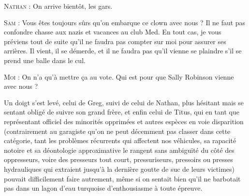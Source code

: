 \begin{dialogue}
\textsc{Nathan} : On arrive bientôt, les gars.

\textsc{Sam} : Vous êtes toujours sûrs qu’on embarque ce clown avec nous ? Il ne faut pas confondre chasse aux nazis et vacances au club Med. En tout cas, je vous préviens tout de suite qu’il ne faudra pas compter sur moi pour assurer ses arrières. Il vient, il se démerde, et il ne faudra pas qu’il vienne se plaindre s’il se prend une balle dans le cul.

\textsc{Moi} : On n’a qu’à mettre ça au vote. Qui est pour que Sally Robinson vienne avec nous ?

\end{dialogue}

Un doigt s’est levé, celui de Greg, suivi de celui de Nathan, plus hésitant mais se sentant obligé de suivre son grand frère, et enfin celui de Titus, qui en tant que représentant officiel des minorités opprimées et autres espèces en voie disparition (contrairement au garagiste qu’on ne peut décemment pas classer dans cette catégorie, tant les problèmes récurrents qui affectent nos véhicules, sa rapacité notoire et sa déontologie approximative le rangent sans ambiguïté du côté des oppresseurs, voire des presseurs tout court, pressuriseurs, pressoirs ou presses hydrauliques qui extraient jusqu’à la dernière goutte de suc de leurs victimes) pouvait difficilement faire autrement, même si on sentait bien qu’il ne barbotait pas dans un lagon d’eau turquoise d’enthousiasme à toute épreuve.

